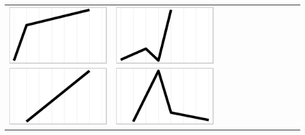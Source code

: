 \documentclass[conference]{worldcomp}
\begin{document}
\begin{table}
\begin{tabular}{ | b{1.5cm} | c | c | c | c | c | c | c | c | c | c | c |}
 \includegraphics[scale=0.08]{figures/bbac.ps} &
 \includegraphics[scale=0.08]{figures/abca.ps} &  

\end{tabular}
\end{table}
\end{document}
